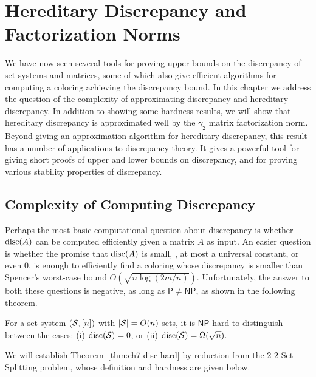 \chapter{Hereditary Discrepancy and Factorization Norms}
\label{ch:gamma2}

We have now seen several tools for proving upper bounds on the
discrepancy of set systems and matrices, some of which also give
efficient algorithms for computing a coloring achieving the
discrepancy bound. In this chapter we address the question of the
complexity of approximating discrepancy and hereditary discrepancy. In
addition to showing some hardness results, we will show that
hereditary discrepancy is approximated well by the
$\gamma_2$ matrix factorization norm. Beyond giving an approximation
algorithm for hereditary discrepancy, this result has a number of
applications to discrepancy theory. It gives a powerful tool for
giving short proofs of upper and lower bounds on discrepancy, and for
proving various stability properties of discrepancy. 

\section{Complexity of Computing Discrepancy}

Perhaps the most basic computational question about discrepancy is
whether $\operatorname{disc}(A)$ can be computed efficiently given a matrix $A$ as
input. An easier question is whether the promise that $\operatorname{disc}(A)$ is
small, \eg, at most a universal constant, or even $0$, is enough to
efficiently find a coloring whose discrepancy is smaller than
Spencer's worst-case bound $O(\sqrt{n\log(2m/n)})$. Unfortunately, the
answer to both these questions is negative, as long as $\mathsf{P}
\neq \mathsf{NP}$, as shown in the following theorem.

\begin{theorem}\label{thm:ch7-disc-hard}
  For a set system $(\mathcal{S}, [n])$ with $|\mathcal{S}| = O(n)$ sets, it is $\mathsf{NP}$-hard to distinguish between the cases: (i) $\operatorname{disc}(\mathcal{S}) = 0$,
or (ii) $\operatorname{disc}(\mathcal{S}) = \Omega(\sqrt{n})$.
\end{theorem}

We will establish Theorem~\ref{thm:ch7-disc-hard} by reduction from
the $2$-$2$ Set Splitting problem, whose definition and hardness are given below. %


